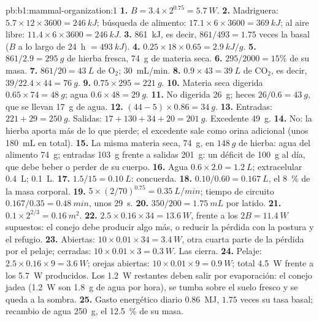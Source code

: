 \begin{solution}{pb:b1:mammal-organization:1}
\textbf{1.} $B = 3.4\times 2^{0.75} = \qty{5.7}{W}$.
\textbf{2.} Madriguera: $5.7\times 12\times 3600 = \qty{246}{kJ}$;
búsqueda de alimento: $17.1\times 6\times 3600 = \qty{369}{kJ}$; al aire
libre: $11.4\times 6\times 3600 = \qty{246}{kJ}$.
\textbf{3.} \qty{861}{kJ}, es decir, $861/493 = 1.75$ veces la basal
($B$ a lo largo de \qty{24}{h} $= \qty{493}{kJ}$).
\textbf{4.} $0.25\times 18\times 0.65 = \qty{2.9}{kJ/g}$.
\textbf{5.} $861/2.9 = \qty{295}{g}$ de hierba fresca, \qty{74}{g} de
materia seca.
\textbf{6.} $295/2000 = 15\%$ de su masa.
\textbf{7.} $861/20 = \qty{43}{L}$ de $\mathrm{O_2}$; \qty{30}{mL/min}.
\textbf{8.} $0.9\times 43 = \qty{39}{L}$ de $\mathrm{CO_2}$, es decir, $39/22.4\times 44 = \qty{76}{g}$.
\textbf{9.} $0.75\times 295 = \qty{221}{g}$.
\textbf{10.} Materia seca digerida $0.65\times 74 = \qty{48}{g}$; agua
$0.6\times 48 = \qty{29}{g}$.
\textbf{11.} No digerida \qty{26}{g}; heces $26/0.6 = \qty{43}{g}$, que
se llevan \qty{17}{g} de agua.
\textbf{12.} $(44 - 5)\times 0.86 = \qty{34}{g}$.
\textbf{13.} Entradas: $221 + 29 = \qty{250}{g}$. Salidas: $17 + 130 + 34 + 20
= \qty{201}{g}$. Excedente \qty{49}{g}.
\textbf{14.} No: la hierba aporta más de lo que pierde; el excedente sale
como orina adicional (unos \qty{180}{mL} en total).
\textbf{15.} La misma materia seca, \qty{74}{g}, en $\qty{148}{g}$ de
hierba: agua del alimento \qty{74}{g}; entradas \qty{103}{g} frente a
salidas \qty{201}{g}: un déficit de \qty{100}{g} al día, que debe beber o
perder de su cuerpo.
\textbf{16.} Agua $0.6\times 2.0 = \qty{1.2}{L}$; extracelular
\qty{0.4}{L};  \qty{0.1}{L}.
\textbf{17.} $1.5/15 = \qty{0.10}{L}$: concuerda.
\textbf{18.} $0.10/0.60 = \qty{0.167}{L}$, el \qty{8}{\%} de la masa corporal.
\textbf{19.} $5\times(2/70)^{0.75} = \qty{0.35}{L/min}$; tiempo de
circuito $0.167/0.35 = \qty{0.48}{min}$, unos \qty{29}{s}.
\textbf{20.} $350/200 = \qty{1.75}{mL}$ por latido.
\textbf{21.} $0.1\times 2^{2/3} = \qty{0.16}{m^2}$.
\textbf{22.} $2.5\times 0.16\times 34 = \qty{13.6}{W}$, frente a los
$2B = \qty{11.4}{W}$ supuestos: el conejo debe producir algo más, o
reducir la pérdida con la postura y el refugio.
\textbf{23.} Abiertas: $10\times 0.01\times 34 = \qty{3.4}{W}$, otra
cuarta parte de la pérdida por el pelaje; cerradas: $10\times 0.01\times 3 =
\qty{0.3}{W}$. Las cierra.
\textbf{24.} Pelaje: $2.5\times 0.16\times 9 = \qty{3.6}{W}$; orejas
abiertas: $10\times 0.01\times 9 = \qty{0.9}{W}$; total \qty{4.5}{W}
frente a los \qty{5.7}{W} producidos. Los \qty{1.2}{W} restantes deben
salir por evaporación: el conejo jadea (\qty{1.2}{W} son \qty{1.8}{g} de
agua por hora), se tumba sobre el suelo fresco y se queda a la sombra.
\textbf{25.} Gasto energético diario \qty{0.86}{MJ}, $1.75$ veces su tasa
basal; recambio de agua \qty{250}{g}, el \qty{12.5}{\%} de su masa.
\end{solution}
